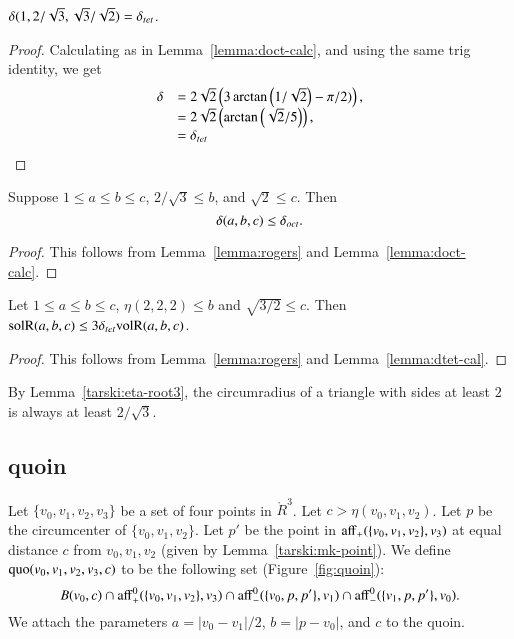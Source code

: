 \begin{lemma}\label{lemma:dtet-cal}
  $\delta(1,2/\sqrt3,\sqrt3/\sqrt2)=\delta_{tet}$.
\end{lemma}

\begin{proof} Calculating as in Lemma~\ref{lemma:doct-calc}, and using
the same trig identity, we get
$$\begin{array}{lll}
  \delta &=
2\sqrt{2} \left(3\arctan\left(1/\sqrt{2}\right) - \pi/2)\right),\\
  &=2\sqrt{2}\left(\arctan\left(\sqrt2/5\right)\right),\\
  &=\delta_{tet}
\end{array}
$$
\end{proof}

\begin{lemma}\label{lemma:rog-doct}
Suppose $1\le a\le  b\le c$,  $2/\sqrt{3}\le b$, and $\sqrt2\le c$.  Then
$$
\delta(a,b,c) \le \delta_{oct}.
$$
\end{lemma}

\begin{proof} This follows from Lemma~\ref{lemma:rogers} and
Lemma~\ref{lemma:doct-calc}.
\end{proof}

\begin{lemma}\label{lemma:rog-tet}
Let $1\le a \le b \le c$, $\eta(2,2,2)\le b$ and $\sqrt{3/2}\le c$.
Then ${\operatorname{solR}}(a,b,c) \le 3 \delta_{tet} {\operatorname{volR}} (a,b,c)$.
\end{lemma}

\begin{proof}  This follows from Lemma~\ref{lemma:rogers} and
Lemma~\ref{lemma:dtet-cal}.
\end{proof}

By Lemma~\ref{tarski:eta-root3}, the circumradius of a triangle
with sides at least $2$ is always at least $2/\sqrt3$.



\subsection{quoin}

Let $\{v_0,v_1,v_2,v_3\}$ be a set of four points in $\ring{R}^3$.
Let $c>  \eta(v_0,v_1,v_2)$.  Let $p$ be the circumcenter
of $\{v_0,v_1,v_2\}$.  Let $p'$ be the point 
in ${\operatorname{aff}}_+(\{v_0,v_1,v_2\},v_3)$ at equal distance $c$
from $v_0,v_1,v_2$ (given by Lemma~\ref{tarski:mk-point}).
We define
${\operatorname{quo}}(v_0,v_1,v_2,v_3,c)$ to be the following set 
(Figure~\ref{fig:quoin}):
   $$
   B(v_0,c) \cap {\operatorname{aff}}_+^0(\{v_0,v_1,v_2\},v_3)
   \cap {\operatorname{aff}}_-^0(\{v_0,p,p'\},v_1) \cap
   {\operatorname{aff}}_-^0(\{v_1,p,p'\},v_0).
   $$
We attach the parameters $a=|v_0-v_1|/2$, $b=|p-v_0|$, and
$c$ to the quoin.

